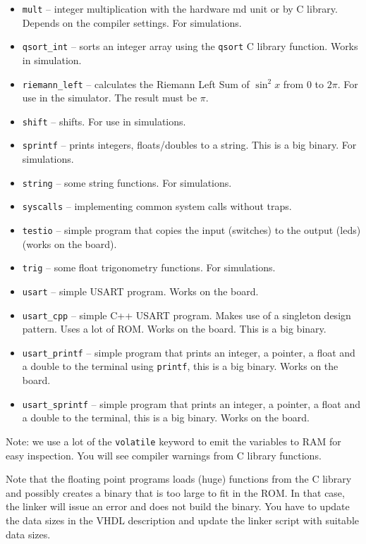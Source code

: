 \documentclass[12pt]{article}
\begin{document}
\begin{itemize}
\item \texttt{mult} -- integer multiplication with the hardware md unit or by C library. Depends on the compiler settings. For simulations.
\item \texttt{qsort\_int} -- sorts an integer array using the \texttt{qsort} C library function. Works in simulation.
\item \texttt{riemann\_left} -- calculates the Riemann Left Sum of $\sin^2 x$ from $0$ to $2\pi$. For use in the simulator. The  result must be $\pi$.
\item \texttt{shift} -- shifts. For use in simulations.
\item \texttt{sprintf} -- prints integers, floats/doubles to a string. This is a big binary. For simulations.
\item \texttt{string} -- some string functions. For simulations.
\item \texttt{syscalls} -- implementing common system calls without traps.
\item \texttt{testio} -- simple program that copies the input (switches) to the output (leds) (works on the board).
\item \texttt{trig} -- some float trigonometry functions. For simulations.
\item \texttt{usart} -- simple USART program. Works on the board.
\item \texttt{usart\_cpp} -- simple C++ USART program. Makes use of a singleton design pattern. Uses a lot of ROM. Works on the board. This is a big binary.
\item \texttt{usart\_printf} -- simple program that prints an integer, a pointer, a float and a double to the terminal using \texttt{printf}, this is a big binary. Works on the board.
\item \texttt{usart\_sprintf} -- simple program that prints an integer, a pointer, a float and a double to the terminal, this is a big binary. Works on the board.
\end{itemize} 

Note: we use a lot of the \texttt{volatile} keyword to emit the variables to RAM for easy inspection. You will see compiler warnings from C library functions.

Note that the floating point programs loads (huge) functions from the C library and possibly creates a binary that is too large to fit in the ROM. In that case, the linker will issue an error and does not build the binary. You have to update the data sizes in the VHDL description and update the linker script with suitable data sizes.
\end{document}
